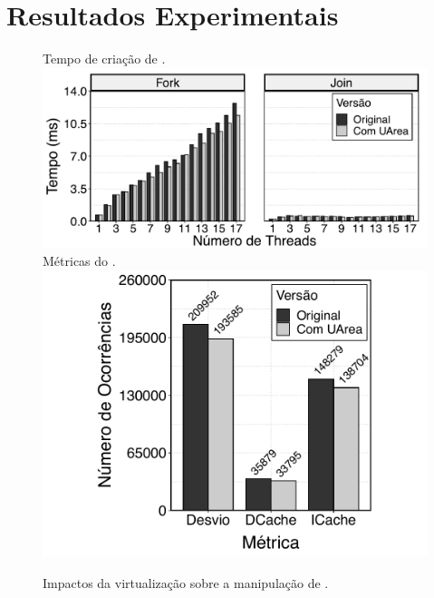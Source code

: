 \chapter{Resultados Experimentais}
\label{chap.results}

\begin{figure}[tb]
	\centering
    \caption{Impactos da virtualização sobre a manipulação de \threads.
    \label{fig.threads}}%
                   {Tempo de criação de \threads.}
                   {\includegraphics[width=\textwidth]{content/images/fork-join-kernel-time-bars.pdf}}
	\quad
                   {Métricas do .}
                   {\includegraphics[width=\textwidth]{content/images/fork-join-kernel-counters.pdf}}
\end{figure}

